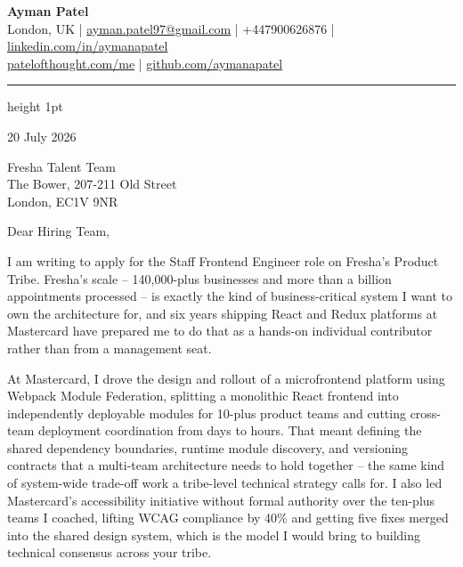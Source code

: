 \documentclass[a4paper,11pt]{article}
\begin{document}
\begin{center}
  {\LARGE \textbf{\color{accent}Ayman Patel}}\\
  \vspace{2pt}
  {\small
  London, UK \quad | \quad
  \href{mailto:ayman.patel97@gmail.com}{ayman.patel97@gmail.com} \quad | \quad
  +447900626876 \quad | \quad
  \href{https://linkedin.com/in/aymanapatel}{linkedin.com/in/aymanapatel}\\
  \href{https://patelofthought.com/me}{patelofthought.com/me} \quad | \quad
  \href{https://github.com/aymanapatel}{github.com/aymanapatel}
  }
\end{center}

\vspace{4pt}
{\color{teal}\hrule height 1pt}
\vspace{14pt}

20 July 2026

Fresha Talent Team\\
The Bower, 207-211 Old Street\\
London, EC1V 9NR

\vspace{6pt}
Dear Hiring Team,

I am writing to apply for the Staff Frontend Engineer role on Fresha's Product Tribe. Fresha's scale -- 140,000-plus businesses and more than a billion appointments processed -- is exactly the kind of business-critical system I want to own the architecture for, and six years shipping React and Redux platforms at Mastercard have prepared me to do that as a hands-on individual contributor rather than from a management seat.

At Mastercard, I drove the design and rollout of a microfrontend platform using Webpack Module Federation, splitting a monolithic React frontend into independently deployable modules for 10-plus product teams and cutting cross-team deployment coordination from days to hours. That meant defining the shared dependency boundaries, runtime module discovery, and versioning contracts that a multi-team architecture needs to hold together -- the same kind of system-wide trade-off work a tribe-level technical strategy calls for. I also led Mastercard's accessibility initiative without formal authority over the ten-plus teams I coached, lifting WCAG compliance by 40\% and getting five fixes merged into the shared design system, which is the model I would bring to building technical consensus across your tribe.
\end{document}
